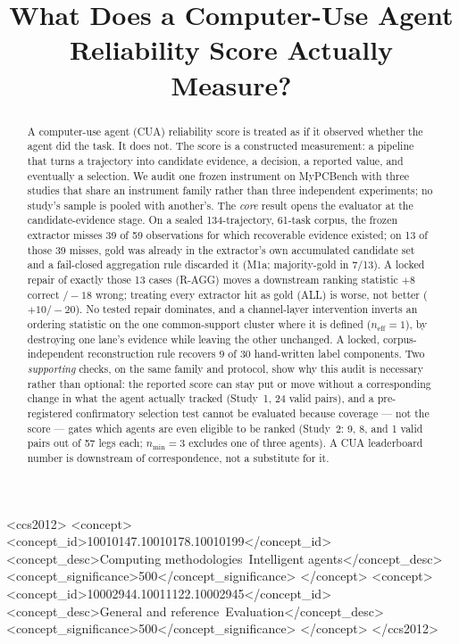 \documentclass[sigconf,anonymous]{aamas}
\title{What Does a Computer-Use Agent Reliability Score Actually Measure?}
\begin{document}
\begin{abstract}
A computer-use agent (CUA) reliability score is treated as if it observed whether the agent did the task.
It does not.
The score is a constructed measurement: a pipeline that turns a trajectory into candidate evidence, a decision, a reported value, and eventually a selection.
We audit one frozen instrument on MyPCBench with three studies that share an instrument family rather than three independent experiments; no study's sample is pooled with another's.
The \emph{core} result opens the evaluator at the candidate-evidence stage.
On a sealed 134-trajectory, 61-task corpus, the frozen extractor misses 39 of 59 observations for which recoverable evidence existed; on 13 of those 39 misses, gold was already in the extractor's own accumulated candidate set and a fail-closed aggregation rule discarded it (M1a; majority-gold in 7/13).
A locked repair of exactly those 13 cases (R-AGG) moves a downstream ranking statistic $+8$ correct $/-18$ wrong; treating every extractor hit as gold (ALL) is worse, not better ($+10/-20$).
No tested repair dominates, and a channel-layer intervention inverts an ordering statistic on the one common-support cluster where it is defined ($n_{\mathrm{eff}}=1$), by destroying one lane's evidence while leaving the other unchanged.
A locked, corpus-independent reconstruction rule recovers 9 of 30 hand-written label components.
Two \emph{supporting} checks, on the same family and protocol, show why this audit is necessary rather than optional: the reported score can stay put or move without a corresponding change in what the agent actually tracked (Study~1, 24 valid pairs), and a pre-registered confirmatory selection test cannot be evaluated because coverage --- not the score --- gates which agents are even eligible to be ranked (Study~2: 9, 8, and 1 valid pairs out of 57 legs each; $n_{\min}=3$ excludes one of three agents).
A CUA leaderboard number is downstream of correspondence, not a substitute for it.
\end{abstract}

\begin{CCSXML}
<ccs2012>
<concept>
<concept_id>10010147.10010178.10010199</concept_id>
<concept_desc>Computing methodologies~Intelligent agents</concept_desc>
<concept_significance>500</concept_significance>
</concept>
<concept>
<concept_id>10002944.10011122.10002945</concept_id>
<concept_desc>General and reference~Evaluation</concept_desc>
<concept_significance>500</concept_significance>
</concept>
</ccs2012>
\end{CCSXML}
\end{document}
